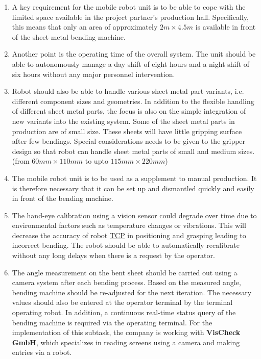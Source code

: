 \begin{enumerate}
    \item A key requirement for the mobile robot unit is to be able to cope with the limited space available in the
    project partner's production hall. Specifically, this means that only an area of approximately $2 m \times 4.5 m$ is
    available in front of the sheet metal bending machine.

    \item Another point is the operating time of the overall system. The unit should be able to autonomously
    manage a day shift of eight hours and a night shift of six hours without any major personnel
    intervention.

    \item Robot should also be able to handle various sheet metal part variants, i.e. different component sizes and
    geometries. In addition to the flexible handling of different sheet metal parts, the focus is also on the
    simple integration of new variants into the existing system. Some of the sheet metal parts in production are
    of small size. These sheets will have little gripping surface after few bendings. Special considerations needs to be given to the
    gripper design so that robot can handle sheet metal parts of small and medium sizes. (from $60 mm \times 110 mm$ to upto $115 mm \times 220 mm$)
  
    \item 
    The mobile robot unit is to be used as a supplement to manual production. It is therefore necessary
    that it can be set up and dismantled quickly and easily in front of the bending machine.

    \item The hand-eye calibration using a vision sensor could degrade over time due to environmental factors such as temperature changes or vibrations.
    This will decrease the accuracy of robot \hyperref[acro:TCP]{TCP} in positioning and grasping leading to incorrect bending.
    The robot should be able to automatically recalibrate without any long delays when there is a request by the operator.
    
    \item The angle measurement on the bent sheet should be carried out using a camera system
    after each bending process. Based on the measured angle, bending machine should be re-adjusted for the next iteration. The
    necessary values should also be entered at the operator terminal by the terminal operating robot. In addition, a
    continuous real-time status query of the bending machine is required via the operating terminal. For
    the implementation of this subtask, the company is working with \textbf{VisCheck GmbH}, which specializes in
    reading screens using a camera and making entries via a robot.
    
\end{enumerate}






